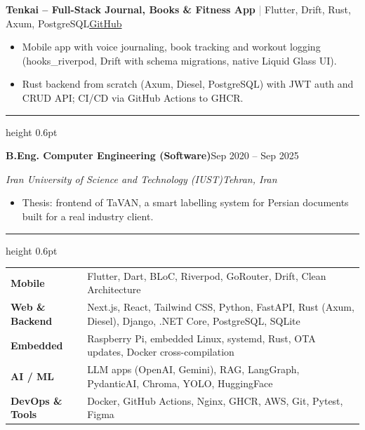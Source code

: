 \documentclass[10pt,a4paper]{article}
\renewcommand{\section}[1]{%
  \vspace{6pt}{\bfseries\color{accent}\MakeUppercase{#1}}\par\nointerlineskip\vspace{1.5pt}%
  {\color{accent}\hrule height 0.6pt}\vspace{3pt}}
\newcommand{\entry}[4]{%
  \vspace{3pt}\textbf{#1}\hfill #3\par
  \textit{#2}\hfill\textit{#4}\par\vspace{1pt}}
\newcommand{\project}[3]{%
  \vspace{3pt}\textbf{#1} \textcolor{gray}{|} {\small #2}\hfill #3\par\vspace{1pt}}
\begin{document}
\project{Tenkai -- Full-Stack Journal, Books \& Fitness App}{Flutter, Drift, Rust, Axum, PostgreSQL}{\href{https://github.com/Hazhir2002/tenkai}{GitHub}}
\begin{itemize}
  \item Mobile app with voice journaling, book tracking and workout logging (hooks\_riverpod, Drift with schema
        migrations, native Liquid Glass UI).
  \item Rust backend from scratch (Axum, Diesel, PostgreSQL) with JWT auth and CRUD API; CI/CD via GitHub Actions to GHCR.
\end{itemize}

\section{Education}
\entry{B.Eng. Computer Engineering (Software)}{Iran University of Science and Technology (IUST)}{Sep 2020 -- Sep 2025}{Tehran, Iran}
\begin{itemize}
  \item Thesis: frontend of TaVAN, a smart labelling system for Persian documents built for a real industry client.
\end{itemize}

\section{Skills}
\begin{tabular}{@{}p{3.1cm}p{14cm}@{}}
  \textbf{Mobile} & Flutter, Dart, BLoC, Riverpod, GoRouter, Drift, Clean Architecture \\
  \textbf{Web \& Backend} & Next.js, React, Tailwind CSS, Python, FastAPI, Rust (Axum, Diesel), Django, .NET Core, PostgreSQL, SQLite \\
  \textbf{Embedded} & Raspberry Pi, embedded Linux, systemd, Rust, OTA updates, Docker cross-compilation \\
  \textbf{AI / ML} & LLM apps (OpenAI, Gemini), RAG, LangGraph, PydanticAI, Chroma, YOLO, HuggingFace \\
  \textbf{DevOps \& Tools} & Docker, GitHub Actions, Nginx, GHCR, AWS, Git, Pytest, Figma \\
\end{tabular}
\end{document}
